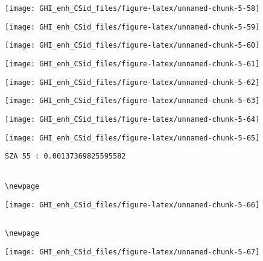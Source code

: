 \documentclass[
  10pt,
  a4paper,oneside]{article}
\begin{document}
\begin{center}\texttt{[image: GHI\_enh\_CSid\_files/figure-latex/unnamed-chunk-5-58]} \end{center}

\begin{center}\texttt{[image: GHI\_enh\_CSid\_files/figure-latex/unnamed-chunk-5-59]} \end{center}

\begin{center}\texttt{[image: GHI\_enh\_CSid\_files/figure-latex/unnamed-chunk-5-60]} \end{center}

\begin{center}\texttt{[image: GHI\_enh\_CSid\_files/figure-latex/unnamed-chunk-5-61]} \end{center}

\begin{center}\texttt{[image: GHI\_enh\_CSid\_files/figure-latex/unnamed-chunk-5-62]} \end{center}

\begin{center}\texttt{[image: GHI\_enh\_CSid\_files/figure-latex/unnamed-chunk-5-63]} \end{center}

\begin{center}\texttt{[image: GHI\_enh\_CSid\_files/figure-latex/unnamed-chunk-5-64]} \end{center}

\begin{center}\texttt{[image: GHI\_enh\_CSid\_files/figure-latex/unnamed-chunk-5-65]} \end{center}

\begin{verbatim}
SZA 55 : 0.00137369825595582 


\newpage
\end{verbatim}

\begin{center}\texttt{[image: GHI\_enh\_CSid\_files/figure-latex/unnamed-chunk-5-66]} \end{center}

\begin{verbatim}

\newpage
\end{verbatim}

\begin{center}\texttt{[image: GHI\_enh\_CSid\_files/figure-latex/unnamed-chunk-5-67]} \end{center}
\end{document}
